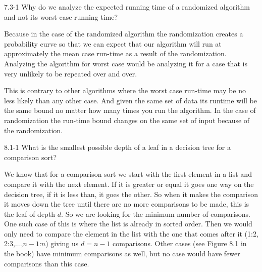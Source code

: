 





\homeworkheader{\classnameandsection}

\begin{problem}{7.3-1}
  Why do we analyze the expected running time of a randomized algorithm and not its worst-case running time?
  \begin{solution}
    Because in the case of the randomized algorithm the randomization creates a probability curve so that we can expect
    that our algorithm will run at approximately the mean case run-time as a result of the randomization. Analyzing the algorithm
    for worst case would be analyzing it for a case that is very unlikely to be repeated over and over.

    This is contrary to other algorithms where the worst case run-time may be no less likely than any other case. And
    given the same set of data its runtime will be the same bound no matter how many times you run the algorithm. In the
    case of randomization the run-time bound changes on the same set of input because of the randomization.
  \end{solution}
\end{problem}

\begin{problem}{8.1-1}
  What is the smallest possible depth of a leaf in a decision tree for a comparison sort?
  \begin{solution}
    We know that for a comparison sort we start with the first element in a list and compare it with the next element.
    If it is greater or equal it goes one way on the decision tree, if it is less than, it goes the other. So when it
    makes the comparison it moves down the tree until there are no more comparisons to be made, this is the leaf of
    depth $d$. So we are looking for the minimum number of comparisons. One such case of this is where the list is
    already in sorted order. Then we would only need to compare the element in the list with the one that comes after it
    (1:2, 2:3,$\ldots$,$n-1$:$n$) giving us $d = n - 1$ comparisons. Other cases (see Figure 8.1 in the book) have
    minimum comparisons as well, but no case would have fewer comparisons than this case.
  \end{solution}
\end{problem} \newpage


